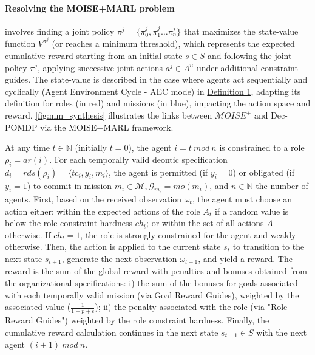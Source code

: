\documentclass[sigconf]{aamas}
\begin{document}
\paragraph{\textbf{Resolving the MOISE+MARL problem}}
involves finding a joint policy $\pi^{j} = \{\pi^j_0,\pi^j_1\dots\pi^j_n\}$ that maximizes the state-value function $V^{\pi^{j}}$ (or reaches a minimum threshold), which represents the expected cumulative reward starting from an initial state $s \in S$ and following the joint policy $\pi^{j}$, applying successive joint actions $a^{j} \in A^n$ under additional constraint guides. The state-value is described in the case where agents act sequentially and cyclically (Agent Environment Cycle - AEC mode) in \hyperref[eq:single_value_function]{Definition 1}, adapting its definition for roles (in red) and missions (in blue), impacting the action space and reward. \autoref{fig:mm_synthesis} illustrates the links between $\mathcal{M}OISE^+$ and Dec-POMDP via the MOISE+MARL framework.

At any time $t \in \mathbb{N}$ (initially $t = 0$), the agent $i = t \ mod \ n$ is constrained to a role $\rho_i = ar(i)$. For each temporally valid deontic specification $d_i = rds(\rho_i) = \langle tc_i,y_i, m_i \rangle$, the agent is permitted (if $y_i = 0$) or obligated (if $y_i = 1$) to commit in mission $m_i \in \mathcal{M}, \mathcal{G}_{m_i} = mo(m_i)$, and $n \in \mathbb{N}$ the number of agents.
%
First, based on the received observation $\omega_t$, the agent must choose an action either: within the expected actions of the role $A_t$ if a random value is below the role constraint hardness $ch_t$; or within the set of all actions $A$ otherwise. If $ch_t = 1$, the role is strongly constrained for the agent and weakly otherwise.
%
Then, the action is applied to the current state $s_t$ to transition to the next state $s_{t+1}$, generate the next observation $\omega_{t+1}$, and yield a reward. The reward is the sum of the global reward with penalties and bonuses obtained from the organizational specifications: \quad i) the sum of the bonuses for goals associated with each temporally valid mission (via Goal Reward Guides), weighted by the associated value ($\frac{1}{1-p+\epsilon}$); \quad ii) the penalty associated with the role (via "Role Reward Guides") weighted by the role constraint hardness.
%
Finally, the cumulative reward calculation continues in the next state $s_{t+1} \in S$ with the next agent $(i+1) \ mod \ n$.
\end{document}
